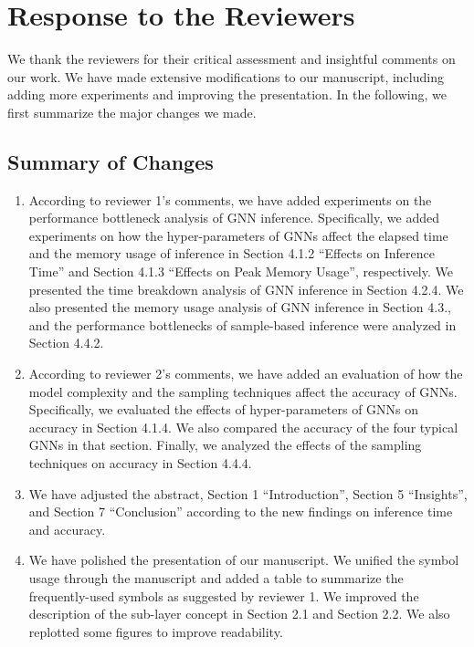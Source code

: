 \documentclass[12pt]{article}
\newcounter{reviewer}
\newcounter{point}[reviewer]
\begin{document}
\section*{Response to the Reviewers}
We thank the reviewers for their critical assessment and insightful comments on our work.
%
We have made extensive modifications to our manuscript, including adding more experiments and improving the presentation.
%
In the following, we first summarize the major changes we made.
%
%

\subsection*{Summary of Changes}

\begin{enumerate}
\item According to reviewer 1's comments, we have added experiments on the performance bottleneck analysis of GNN inference.
%
Specifically, we added experiments on how the hyper-parameters of GNNs affect the elapsed time and the memory usage of inference in Section 4.1.2 ``Effects on Inference Time'' and Section 4.1.3 ``Effects on Peak Memory Usage'', respectively.
%
We presented the time breakdown analysis of GNN inference in Section 4.2.4.
%
We also presented the memory usage analysis of GNN inference in Section 4.3., and the performance bottlenecks of sample-based inference were analyzed in Section 4.4.2.

\item According to reviewer 2's comments, we have added an evaluation of how the model complexity and the sampling techniques affect the accuracy of GNNs.
%
Specifically, we evaluated the effects of hyper-parameters of GNNs on accuracy in Section 4.1.4.
%
We also compared the accuracy of the four typical GNNs in that section.
%
Finally, we analyzed the effects of the sampling techniques on accuracy in Section 4.4.4.

\item We have adjusted the abstract, Section 1 ``Introduction'', Section 5 ``Insights'', and Section 7 ``Conclusion'' according to the new findings on inference time and accuracy.

\item We have polished the presentation of our manuscript.
%
We unified the symbol usage through the manuscript and added a table to summarize the frequently-used symbols as suggested by reviewer 1.
%
We improved the description of the sub-layer concept in Section 2.1 and Section 2.2.
%
We also replotted some figures to improve readability.


\end{enumerate}
\end{document}
